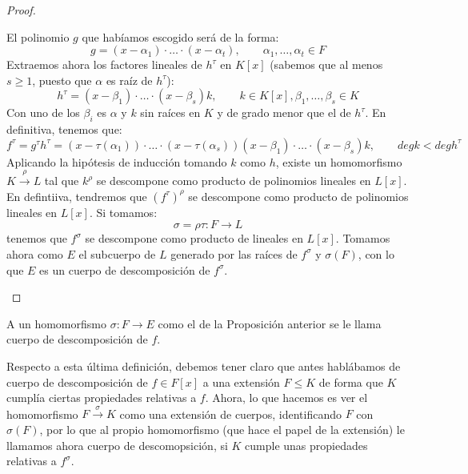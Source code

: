 \begin{prop}
\begin{proof}
\begin{itemize}
                El polinomio $g$ que habíamos escogido será de la forma:
                \begin{equation*}
                    g = (x-\alpha_1)\cdot  \ldots \cdot (x-\alpha_t), \qquad \alpha_1,\ldots,\alpha_t \in F
                \end{equation*}
                Extraemos ahora los factores lineales de $h^\tau$ en $K[x]$ (sabemos que al menos $s\geq 1$, puesto que $\alpha$ es raíz de $h^\tau$):
                \begin{equation*}
                    h^\tau = (x-\beta_1)\cdot \ldots\cdot (x-\beta_s)k, \qquad k\in K[x], \beta_1,\ldots,\beta_s\in K
                \end{equation*}
                Con uno de los $\beta_i$ es $\alpha$ y $k$ sin raíces en $K$ y de grado menor que el de $h^\tau$. En definitiva, tenemos que:
                \begin{equation*}
                    f^\tau = g^\tau h^\tau = (x-\tau(\alpha_1))\cdot  \ldots \cdot (x-\tau(\alpha_s))(x-\beta_1) \cdot \ldots \cdot (x-\beta_s)k, \qquad deg k < deg h^\tau
                \end{equation*}
                Aplicando la hipótesis de inducción tomando $k$ como $h$, existe un homomorfismo $K\stackrel{\rho}{\to}L$ tal que $k^\rho$  se descompone como producto de polinomios lineales en $L[x]$. En defintiiva, tendremos que ${(f^\tau)}^{\rho}$ se descompone como producto de polinomios lineales en $L[x]$. Si tomamos:
                \begin{equation*}
                    \sigma = \rho\tau : F\to L
                \end{equation*}
                tenemos que $f^\sigma$ se descompone como producto de lineales en $L[x]$. Tomamos ahora como $E$ el subcuerpo de $L$ generado por las raíces de $f^\sigma$ y $\sigma(F)$, con lo que $E$ es un cuerpo de descomposición de $f^\sigma$.
        \end{itemize}
    \end{proof}
\end{prop}

\begin{definicion}
    A un homomorfismo $\sigma:F\to E$ como el de la Proposición anterior se le llama cuerpo de descomposición de $f$.
\end{definicion}

\noindent
Respecto a esta última definición, debemos tener claro que antes hablábamos de cuerpo de descomposición de $f\in F[x]$ a una extensión $F\leq K$ de forma que $K$ cumplía ciertas propiedades relativas a $f$. Ahora, lo que hacemos es ver el homomorfismo $F\stackrel{\sigma}{\to} K$ como una extensión de cuerpos, identificando $F$ con $\sigma(F)$, por lo que al propio homomorfismo (que hace el papel de la extensión) le llamamos ahora cuerpo de descomopsición, si $K$ cumple unas propiedades relativas a $f^\sigma$.

